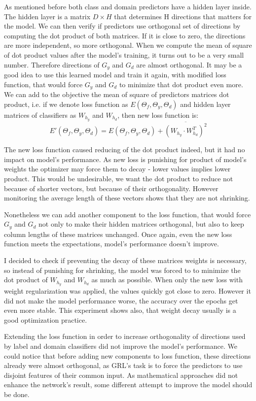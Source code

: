 \documentclass{article}
\begin{document}
\par
As mentioned before both class and domain predictors have a hidden layer inside. The hidden layer is a matrix $D \times H$ that determines H directions that matters for the model. We can then verify if predictors use orthogonal set of directions by computing the dot product of both matrices. If it is close to zero, the directions are more independent, so more orthogonal. When we compute the mean of square of dot product values after the model's training, it turns out to be a very small number. Therefore directions of $G_{y}$ and $G_{d}$ are almost orthogonal. It may be a good idea to use this learned model and train it again, with modified loss function, that would force $G_{y}$ and $G_{d}$ to minimize that dot product even more. We can add to the objective the mean of square of predictors matrices dot product, i.e. if we denote loss function as $E(\Theta_{f}, \Theta_{y}, \Theta_{d})$ and hidden layer matrices of classifiers as $W_{h_{y}}$ and $W_{h_{d}}$, then new loss function is:
\begin{equation*}
E'(\Theta_{f}, \Theta_{y}, \Theta_{d}) = E(\Theta_{f}, \Theta_{y}, \Theta_{d}) + \overline{(W_{h_{y}} \cdot W_{h_{d}}^{T})^{2}}
\end{equation*}
\par
The new loss function caused reducing of the dot product indeed, but it had no impact on model's performance. As new loss is punishing for product of model's weights the optimizer may force them to decay - lower values implies lower product. This would be undesirable, we want the dot product to reduce not because of shorter vectors, but because of their orthogonality. However monitoring the average length of these vectors shows that they are not shrinking. 
\par
Nonetheless we can add another component to the loss function, that would force $G_{y}$ and $G_{d}$ not only to make their hidden matrices orthogonal, but also to keep column lengths of these matrices unchanged. Once again, even the new loss function meets the expectations, model's performance doesn't improve.
\par
I decided to check if preventing the decay of these matrices weights is necessary, so instead of punishing for shrinking, the model was forced to to minimize the dot product of $W_{h_{y}}$ and $W_{h_{d}}$ as much as possible. When only the new loss with weight regularization was applied, the values quickly got close to zero. However it did not make the model performance worse, the accuracy over the epochs get even more stable. This experiment shows also, that weight decay usually is a good optimization practice.
\par
Extending the loss function in order to increase orthogonality of directions used by label and domain classifiers did not improve the model's performance. We could notice that before adding new components to loss function, these directions already were almost orthogonal, as GRL's task is to force the predictors to use disjoint features of their common input. As mathematical approaches did not enhance the network's result, some different attempt to improve the model should be done.
\end{document}
